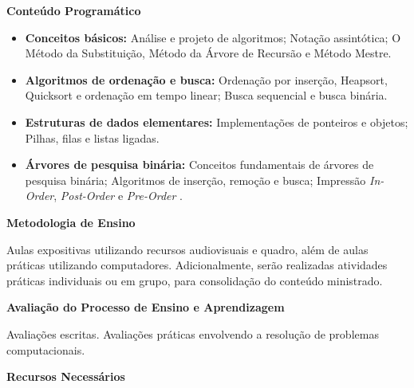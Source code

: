 
\begin{snugshade}\begin{center}\textbf{
    Conteúdo Programático
}\end{center}\end{snugshade}

\begin{itemize}

 \item \textbf{Conceitos básicos:} Análise e projeto de algoritmos; Notação assintótica; O Método da Substituição, Método da Árvore de Recursão e Método Mestre.
 
 \item \textbf{Algoritmos de ordenação e busca:} Ordenação por inserção, Heapsort, Quicksort e ordenação em tempo linear; Busca sequencial e busca binária.
 
 \item \textbf{Estruturas de dados elementares:} Implementações de ponteiros e objetos; Pilhas, filas e listas ligadas.
 
 \item \textbf{Árvores de pesquisa binária:} Conceitos fundamentais de árvores de pesquisa binária; Algoritmos de inserção, remoção e busca; Impressão \textit{In-Order}, \textit{Post-Order} e \textit{Pre-Order} .
 
\end{itemize}

\begin{snugshade}\begin{center}\textbf{
    Metodologia de Ensino
}\end{center}\end{snugshade}

\noindent
   Aulas expositivas utilizando recursos audiovisuais e quadro, além de aulas práticas utilizando computadores. Adicionalmente, serão realizadas atividades práticas individuais ou em grupo, para consolidação do conteúdo ministrado.

\begin{snugshade}\begin{center}\textbf{
    Avaliação do Processo de Ensino e Aprendizagem
}\end{center}\end{snugshade}

\noindent
   Avaliações escritas. Avalia\c{c}\~oes pr\'aticas envolvendo a resolu\c{c}\~ao de problemas computacionais.
   
\begin{snugshade}\begin{center}\textbf{
    Recursos Necessários
    \vphantom{q} %
}\end{center}\end{snugshade}

